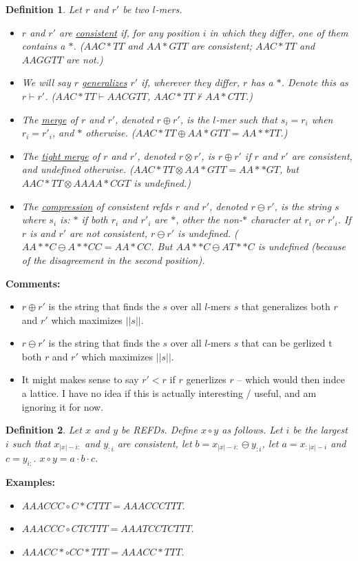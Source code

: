 \documentclass{article}
\newtheorem{definition}{Definition}
\begin{document}
\begin{definition}
Let $r$ and $r'$ be two $l$-mers.
\begin{itemize}
\item $r$ and $r'$ are \underline{consistent} if,
  for any position $i$ in which they differ, one of them contains a
  $*$.  ($AAC*TT$ and $AA*GTT$ are consistent; $AAC*TT$ and $AAGGTT$
  are not.)
\item We will say $r$ \underline{generalizes} $r'$ if, wherever they differ,
  $r$ has a $*$.  Denote this as $r \vdash r'$.  ($AAC*TT \vdash AACGTT$, 
  $AAC*TT \not\vdash AA*CTT$.)
\item The \underline{merge} of $r$ and $r'$, denoted $r \oplus r'$, is
  the $l$-mer such that $s_i = r_i$ when $r_i=r'_i$,
  and $*$ otherwise. ($AAC*TT \oplus AA*GTT = AA**TT$.) 
\item The \underline{tight merge} of $r$ and $r'$, denoted $r \otimes r'$,
  is $r \oplus r'$ if $r$ and $r'$ are consistent, and undefined
  otherwise. ($AAC*TT \otimes AA*GTT = AA**GT$, but $AAC*TT \otimes AAAA*CGT$ is undefined.)
\item The \underline{compression} of consistent refds $r$ and $r'$, denoted $r\ominus r'$, 
  is the string $s$ where $s_i$ is: $*$ if both $r_i$ and $r'_i$ are
  $*$, other the non-$*$ character at $r_i$ or $r'_i$.  If $r$ is and
  $r'$ are not consistent, $r \ominus r'$ is undefined.  ($AA**C
  \ominus A**CC = AA*CC$.  But $AA**C \ominus AT**C$ is undefined
  (because of the disagreement in the second position).
\end{itemize}
\end{definition}

{\bf Comments:}
\begin{itemize}
\item $r \oplus r'$ is the string that finds the $s$ over all
$l$-mers $s$ that generalizes both $r$ and $r'$ which maximizes $||s||$.
\item $r \ominus r'$ is the string that finds the $s$ over all
  $l$-mers $s$ that can be gerlized t both $r$ and $r'$ which
  maximizes $||s||$.
\item It might makes sense to say $r' < r$ if $r$ generlizes $r$ --
  which would then indce a lattice.  I have no idea if this is
  actually interesting / useful, and am ignoring it for now.
\end{itemize}


\begin{definition}
Let $x$ and $y$ be REFDs. Define $x \circ y$ as follows.  Let $i$ be
the largest $i$ such that $x_{|x|-i:}$ and $y_{:i}$ are consistent, let
$b = x_{|x|-i:} \ominus y_{:i}$, let $a = x_{:|x|-i}$ and $c = y_{i:}$.  
$x \circ y = a \cdot b \cdot c$.
\end{definition}
{\bf Examples:}
\begin{itemize}
\item $AAACCC \circ C*CTTT = AAACCCTTT$.
\item $AAACCC \circ CTCTTT = AAATCCTCTTT$.
\item $AAACC* \circ CC*TTT = AAACC*TTT$.
\end{itemize}
\end{document}
